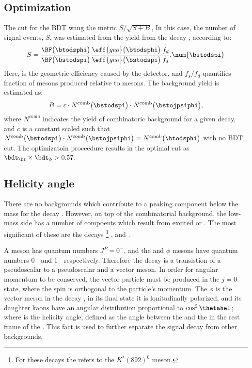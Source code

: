 \subsection{Optimization}
The cut for the BDT wang the metric $S/\sqrt{S+B}$,
In this case, the number of signal events, $S$, was estimated from the yield from the decay
\decay{\Bs}{\Dsm\pip}, according to:
\begin{equation}
  S = \frac{ \BF\big(\btodsphi\big) }{ \BF\big(\bstodspi\big) }
  \frac{ \eff{geo}\big(\btodsphi\big) }{ \eff{geo}\big(\bstodspi\big) }
  \frac{f_d}{f_s}.
  \num{\bstodspi}
\end{equation}
Here,  is the geometric efficiency caused by the detector, and $f_s/f_d$ quantifies
fraction of \Bs mesons produced relative to \Bd mesons.
The background yield is estimated as:
\begin{equation}
  B = c\cdot N^\mathrm{comb}\big(\bstodspi\big)\cdot N^\mathrm{comb}\big(\bstojpsiphi\big),
\end{equation}
where $N^\mathrm{comb}$ indicates the yield of combinatoric background for a given decay, and
$c$ is a constant scaled such that
$N^\mathrm{comb}\big(\bstodspi\big)\cdot
N^\mathrm{comb}\big(\bstojpsiphi\big)=N^\mathrm{comb}\big(\btodsphi\big)$ with no BDT cut.
The optimizatoin proceedure results in the optimal cut as $\bdt_{\Ds}\times\bdt_\phi>0.57$.



\subsection{Helicity angle}
There are no backgrounds which contribute to a peaking component below the \Bp mass for the decay
\btodsphi.
However, on top of the combinatorial background, the low-mass side has a number of compoents which
result from excited \Dssp or \Kstarz.
The most significant of these are the decays
\footnote{
  For these decays the \Kstarz refers to the $K^*(892)^0$ meson.
}
\btodsstrphi, \bstodskstrk and \bstodsstrkstrk.

A \Bp meson has quantum numbers $J^P=0^-$, and the \Ds and $\phi$ mesons have
quantum numbers $0^-$ and $1^-$ respectively.
Therefore the decay \btodsphi is a transistion of a pseudoscalar to a pseudoscalar and a vector
meson.
In order for angular momentum to be conserved, the vector particle must be produced in the $j=0$
state, where the spin is orthogonal to the particle's momentum.
The $\phi$ is the vector meson in the decay \btodsphi, in its final state it is lonitudinally
polarized, and its daughter kaons have an angular distribution proportional to $\cos^2\thetahel$;
where \thetahel is the helicity angle, defined as the angle between the \Kp and the \Bp in the rest frame of the \Ds.
This fact is used to further separate the signal decay \btodsphi from other backgrounds.

